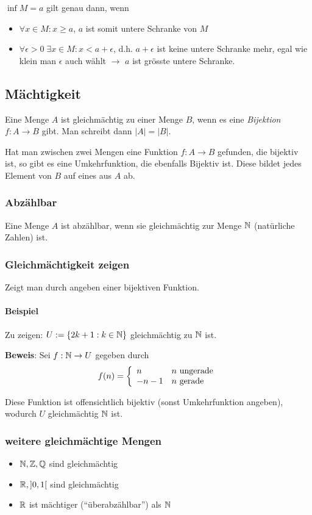 \begin{multicols}{2}
$\inf M = a$ gilt genau dann, wenn
\begin{itemize}
	\item $\forall x \in M: x \geq a$, $a$ ist somit untere Schranke von $M$
	\item $\forall \epsilon > 0 \; \exists x \in M: x < a + \epsilon$, d.h. $a + \epsilon$ ist keine untere Schranke mehr, egal wie klein man $\epsilon$ auch wählt $\rightarrow$ $a$ ist grösste untere Schranke.
\end{itemize}

\subsection{Mächtigkeit}
Eine Menge $A$ ist gleichmächtig zu einer Menge $B$, wenn es eine \textit{Bijektion}
$f: A \rightarrow B$ gibt. Man schreibt dann $|A| = |B|$.

Hat man zwischen zwei Mengen eine Funktion $f: A \rightarrow B$ gefunden, die bijektiv ist,
so gibt es eine Umkehrfunktion, die ebenfalls Bijektiv ist. Diese bildet jedes Element von $B$
auf eines aus $A$ ab.

\subsubsection{Abzählbar}
Eine Menge $A$ ist abzählbar, wenn sie gleichmächtig zur Menge $\mathbb{N}$ (natürliche Zahlen) ist.

\subsubsection{Gleichmächtigkeit zeigen}
Zeigt man durch angeben einer bijektiven Funktion.

\paragraph{Beispiel}
Zu zeigen: $U := \{ 2k + 1: k \in \mathbb{N} \}$ gleichmächtig zu $\mathbb{N}$ ist.

\textbf{Beweis}: Sei $f: \mathbb{N} \rightarrow U$ gegeben durch
\begin{equation*}
f(n) = \left\{
	\begin{array}{l l}
		n & n \text{ ungerade}\\
		-n - 1 & n \text{ gerade}
	\end{array}
\right.
\end{equation*}

Diese Funktion ist offensichtlich bijektiv (sonst Umkehrfunktion angeben), wodurch $U$ gleichmächtig $\mathbb{N}$ ist.

\subsubsection{weitere gleichmächtige Mengen}
\begin{itemize}
	\item $\mathbb{N}, \mathbb{Z}, \mathbb{Q}$ sind gleichmächtig
	\item $\mathbb{R}, ]0,1[$ sind gleichmächtig
	\item $\mathbb{R}$ ist mächtiger (``überabzählbar'') als $\mathbb{N}$
\end{itemize}

\end{multicols}